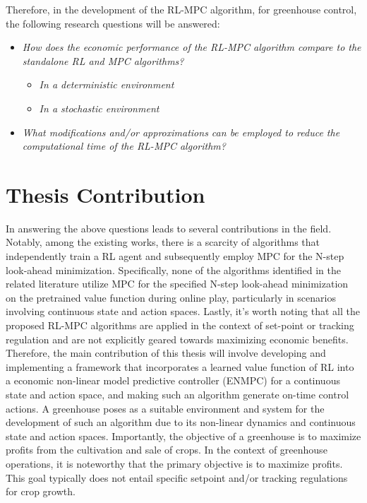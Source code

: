 Therefore, in the development of the RL-MPC algorithm, for greenhouse control, the following research questions will be answered:

\begin{itemize}[itemsep=7pt] %
	\item \textit{How does the economic performance of the RL-MPC algorithm compare to the standalone RL and MPC algorithms?} \begin{itemize}
		\item \textit{In a deterministic environment}
		\item \textit{In a stochastic environment}
	\end{itemize}
	\item \textit{What modifications and/or approximations can be employed to reduce the computational time of the RL-MPC algorithm?}
\end{itemize}




\section{Thesis Contribution}

In answering the above questions leads to several contributions in the field. Notably, among the existing works, there is a scarcity of algorithms that independently train a RL agent and subsequently employ MPC for the N-step look-ahead minimization. Specifically, none of the algorithms identified in the related literature utilize MPC for the specified N-step look-ahead minimization on the pretrained value function during online play, particularly in scenarios involving continuous state and action spaces. Lastly, it's worth noting that all the proposed RL-MPC algorithms are applied in the context of set-point or tracking regulation and are not explicitly geared towards maximizing economic benefits.
Therefore, the main contribution of this thesis will involve developing and implementing a framework that incorporates a learned value function of RL into a economic non-linear model predictive controller (ENMPC) for a continuous state and action space, and making such an algorithm generate on-time control actions. A greenhouse poses as a suitable environment and system for the development of such an algorithm due to its non-linear dynamics and continuous state and action spaces. Importantly, the objective of a greenhouse is to maximize profits from the cultivation and sale of crops. In the context of greenhouse operations, it is noteworthy that the primary objective is to maximize profits. This goal typically does not entail specific setpoint and/or tracking regulations for crop growth.


